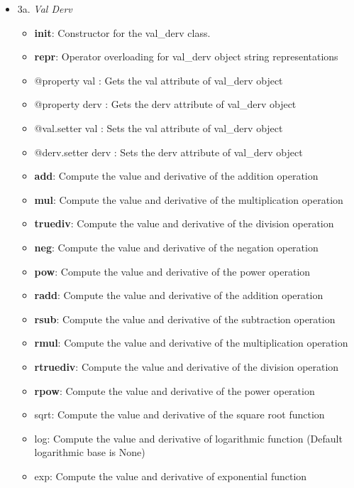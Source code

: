 \documentclass[11pt]{article}
\providecommand{\tightlist}{%
      \setlength{\itemsep}{0pt}\setlength{\parskip}{0pt}}
\begin{document}
\begin{itemize}
\tightlist
\item
  3a. \emph{Val Derv}

  \begin{itemize}
  \item
    \textbf{init}: Constructor for the val\_derv class.
  \item
    \textbf{repr}: Operator overloading for val\_derv object string
    representations
  \item
    @property val : Gets the val attribute of val\_derv object
  \item
    @property derv : Gets the derv attribute of val\_derv object
  \item
    @val.setter val : Sets the val attribute of val\_derv object
  \item
    @derv.setter derv : Sets the derv attribute of val\_derv object
  \item
    \textbf{add}: Compute the value and derivative of the addition
    operation
  \item
    \textbf{mul}: Compute the value and derivative of the multiplication
    operation
  \item
    \textbf{truediv}: Compute the value and derivative of the division
    operation
  \item
    \textbf{neg}: Compute the value and derivative of the negation
    operation
  \item
    \textbf{pow}: Compute the value and derivative of the power
    operation
  \item
    \textbf{radd}: Compute the value and derivative of the addition
    operation
  \item
    \textbf{rsub}: Compute the value and derivative of the subtraction
    operation
  \item
    \textbf{rmul}: Compute the value and derivative of the
    multiplication operation
  \item
    \textbf{rtruediv}: Compute the value and derivative of the division
    operation
  \item
    \textbf{rpow}: Compute the value and derivative of the power
    operation
  \item
    sqrt: Compute the value and derivative of the square root function
  \item
    log: Compute the value and derivative of logarithmic function
    (Default logarithmic base is None)
  \item
    exp: Compute the value and derivative of exponential function

\end{itemize}
\end{itemize}
\end{document}

